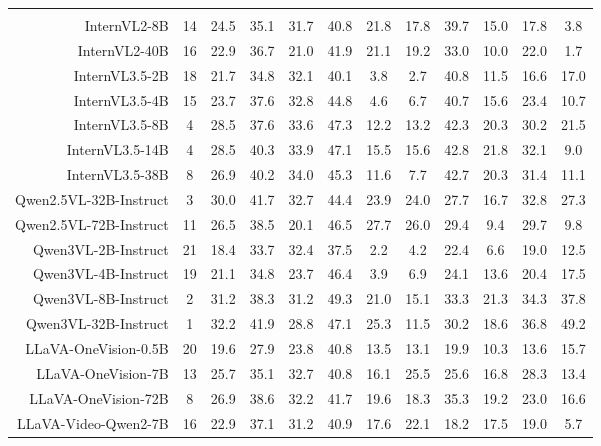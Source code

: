\documentclass{article}
\begin{document}
\begin{figure}[ht!]
{\begin{tabular}{r|cc|ccccccccc}
\rowcolor{green!10}
\multicolumn{1}{l|}{\textcolor{black}{\textit{Open-source Models}}} & & & & & & & & & & & \\
InternVL2-8B & 14 & 24.5 & 35.1 & 31.7 & 40.8 & 21.8 & 17.8 & 39.7 & 15.0 & 17.8 & 3.8 \\
InternVL2-40B & 16 & 22.9 & 36.7 & 21.0 & 41.9 & 21.1 & 19.2 & 33.0 & 10.0 & 22.0 & 1.7 \\
InternVL3.5-2B & 18 & 21.7 & 34.8 & 32.1 & 40.1 & 3.8 & 2.7 & 40.8 & 11.5 & 16.6 & 17.0 \\
InternVL3.5-4B & 15 & 23.7 & 37.6 & 32.8 & 44.8 & 4.6 & 6.7 & 40.7 & 15.6 & 23.4 & 10.7 \\
InternVL3.5-8B & 4 & 28.5 & 37.6 & 33.6 & 47.3 & 12.2 & 13.2 & 42.3 & 20.3 & 30.2 & 21.5 \\
InternVL3.5-14B & 4 & 28.5 & 40.3 & 33.9 & 47.1 & 15.5 & 15.6 & \cellcolor{deeper-gray}42.8 & 21.8 & 32.1 & 9.0 \\
InternVL3.5-38B & 8 & 26.9 & 40.2 & 34.0 & 45.3 & 11.6 & 7.7 & \cellcolor{light-gray}42.7 & 20.3 & 31.4 & 11.1 \\
Qwen2.5VL-32B-Instruct & 3 & 30.0 & 41.7 & 32.7 & 44.4 & 23.9 & 24.0 & 27.7 & 16.7 & 32.8 & 27.3 \\
Qwen2.5VL-72B-Instruct & 11 & 26.5 & 38.5 & 20.1 & 46.5 & 27.7 & 26.0 & 29.4 & 9.4 & 29.7 & 9.8 \\
Qwen3VL-2B-Instruct & 21 & 18.4 & 33.7 & 32.4 & 37.5 & 2.2 & 4.2 & 22.4 & 6.6 & 19.0 & 12.5 \\
Qwen3VL-4B-Instruct & 19 & 21.1 & 34.8 & 23.7 & 46.4 & 3.9 & 6.9 & 24.1 & 13.6 & 20.4 & 17.5 \\
Qwen3VL-8B-Instruct & 2 & 31.2 & 38.3 & 31.2 & 49.3 & 21.0 & 15.1 & 33.3 & 21.3 & \cellcolor{light-gray}34.3 & 37.8 \\
Qwen3VL-32B-Instruct & 1 & \cellcolor{light-gray}32.2 & \cellcolor{light-gray}41.9 & 28.8 & 47.1 & 25.3 & 11.5 & 30.2 & 18.6 & \cellcolor{deeper-gray}36.8 & \cellcolor{deeper-gray}49.2 \\
LLaVA-OneVision-0.5B & 20 & 19.6 & 27.9 & 23.8 & 40.8 & 13.5 & 13.1 & 19.9 & 10.3 & 13.6 & 15.7 \\
LLaVA-OneVision-7B & 13 & 25.7 & 35.1 & 32.7 & 40.8 & 16.1 & 25.5 & 25.6 & 16.8 & 28.3 & 13.4 \\
LLaVA-OneVision-72B & 8 & 26.9 & 38.6 & 32.2 & 41.7 & 19.6 & 18.3 & 35.3 & 19.2 & 23.0 & 16.6 \\
LLaVA-Video-Qwen2-7B & 16 & 22.9 & 37.1 & 31.2 & 40.9 & 17.6 & 22.1 & 18.2 & 17.5 & 19.0 & 5.7 \\

\end{tabular}}
\end{figure}
\end{document}
